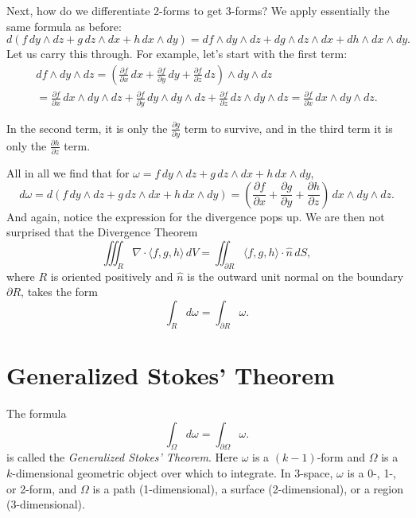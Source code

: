 \documentclass[12pt]{article}
\begin{document}
Next, how do we differentiate 2-forms to get 3-forms?  We apply essentially
the same formula as before:
\[
d(
f\, dy \wedge dz + 
g\, dz \wedge dx +
h\, dx \wedge dy
)
=
df \wedge dy \wedge dz + 
dg \wedge dz \wedge dx +
dh \wedge dx \wedge dy .
\]
Let us carry this through.  For example, let's start with the first
term:
\begin{multline*}
df \wedge dy \wedge dz 
=
\left(
\frac{\partial f}{\partial x} \, dx +
\frac{\partial f}{\partial y} \, dy +
\frac{\partial f}{\partial z} \, dz 
\right)
\wedge dy \wedge dz 
\\
=
\frac{\partial f}{\partial x} \, dx 
\wedge dy \wedge dz +
\frac{\partial f}{\partial y} \, dy 
\wedge dy \wedge dz +
\frac{\partial f}{\partial z} \, dz 
\wedge dy \wedge dz 
=
\frac{\partial f}{\partial x} \, dx \wedge dy \wedge dz .
\end{multline*}

In the second term, it is only the $\frac{\partial g}{\partial y}$ term to
survive, and in the third term it is only the
$\frac{\partial h}{\partial z}$ term.

All in all we find
that for
$\omega = f\, dy \wedge dz + 
g\, dz \wedge dx +
h\, dx \wedge dy$,
\begin{equation*}
d\omega =
d(
f\, dy \wedge dz + 
g\, dz \wedge dx +
h\, dx \wedge dy
)
=
\left(\frac{\partial f}{\partial x} +
\frac{\partial g}{\partial y} +
\frac{\partial h}{\partial z} \right) \, dx \wedge dy \wedge dz .
\end{equation*}
And again, notice the expression for the divergence pops up.
We are then not surprised that the Divergence Theorem
\begin{equation*}
\iiint_R \nabla \cdot \langle f,g,h \rangle \, dV = \iint_{\partial R}
\langle f,g,h \rangle \cdot
\hat{n} \, dS,
\end{equation*}
where $R$ is oriented positively and 
$\hat{n}$ is the outward unit normal on
the boundary $\partial R$,
takes the form
\begin{equation*}
\int_R d \omega = \int_{\partial R} \omega .
\end{equation*}

\section*{Generalized Stokes' Theorem}

The formula
\begin{equation*}
\int_\Omega d \omega = \int_{\partial \Omega} \omega .
\end{equation*}
is called the \emph{Generalized Stokes' Theorem}.  Here $\omega$ is a
$(k-1)$-form and $\Omega$ is a $k$-dimensional geometric object over which to
integrate.  In 3-space, $\omega$ is a 0-, 1-, or 2-form, and
$\Omega$ is a path (1-dimensional), a surface
(2-dimensional), or a region (3-dimensional).
\end{document}
